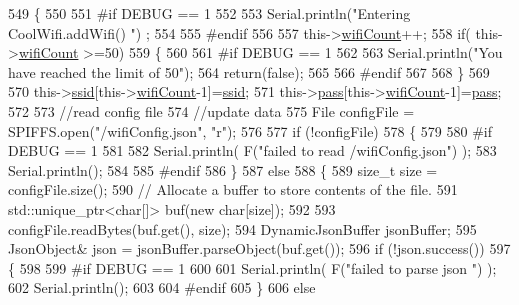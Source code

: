 \begin{DoxyCode}
549 \{
550 
551 \textcolor{preprocessor}{#if DEBUG == 1}
552     
553     Serial.println(\textcolor{stringliteral}{"Entering CoolWifi.addWifi() "}) ;
554 
555 \textcolor{preprocessor}{#endif  }
556     
557     this->\hyperlink{class_cool_wifi_ab133bd92fcb895b884deecd6678592e4}{wifiCount}++;
558     \textcolor{keywordflow}{if}( this->\hyperlink{class_cool_wifi_ab133bd92fcb895b884deecd6678592e4}{wifiCount} >=50)
559     \{
560     
561 \textcolor{preprocessor}{    #if DEBUG == 1}
562 
563         Serial.println(\textcolor{stringliteral}{"You have reached the limit of 50"});
564         \textcolor{keywordflow}{return}(\textcolor{keyword}{false});  
565     
566 \textcolor{preprocessor}{    #endif}
567 
568     \}
569 
570     this->\hyperlink{class_cool_wifi_a893b21d0fed821438733bba2e73fb4c2}{ssid}[this->\hyperlink{class_cool_wifi_ab133bd92fcb895b884deecd6678592e4}{wifiCount}-1]=\hyperlink{class_cool_wifi_a893b21d0fed821438733bba2e73fb4c2}{ssid};
571     this->\hyperlink{class_cool_wifi_a0c3332a149245aaad060b32593a54c9b}{pass}[this->\hyperlink{class_cool_wifi_ab133bd92fcb895b884deecd6678592e4}{wifiCount}-1]=\hyperlink{class_cool_wifi_a0c3332a149245aaad060b32593a54c9b}{pass};
572     
573     \textcolor{comment}{//read config file}
574     \textcolor{comment}{//update data}
575     File configFile = SPIFFS.open(\textcolor{stringliteral}{"/wifiConfig.json"}, \textcolor{stringliteral}{"r"});
576 
577     \textcolor{keywordflow}{if} (!configFile) 
578     \{
579     
580 \textcolor{preprocessor}{    #if DEBUG == 1 }
581 
582         Serial.println( F(\textcolor{stringliteral}{"failed to read /wifiConfig.json"}) );
583         Serial.println();
584 
585 \textcolor{preprocessor}{    #endif}
586     \}
587     \textcolor{keywordflow}{else}
588     \{
589         \textcolor{keywordtype}{size\_t} size = configFile.size();
590         \textcolor{comment}{// Allocate a buffer to store contents of the file.}
591         std::unique\_ptr<char[]> buf(\textcolor{keyword}{new} \textcolor{keywordtype}{char}[size]);
592 
593         configFile.readBytes(buf.get(), size);
594         DynamicJsonBuffer jsonBuffer;
595         JsonObject& json = jsonBuffer.parseObject(buf.get());
596         \textcolor{keywordflow}{if} (!json.success()) 
597         \{
598         
599 \textcolor{preprocessor}{        #if DEBUG == 1 }
600 
601             Serial.println( F(\textcolor{stringliteral}{"failed to parse json "}) );
602             Serial.println();
603         
604 \textcolor{preprocessor}{        #endif}
605         \} 
606         \textcolor{keywordflow}{else}

\end{DoxyCode}
